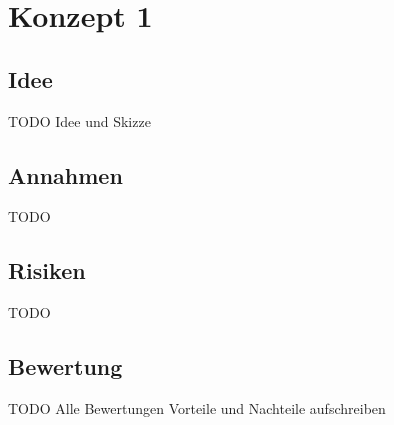 \section{Konzept 1}

\subsection{Idee}
TODO Idee und Skizze

\subsection{Annahmen}
TODO

\subsection{Risiken}
TODO

\subsection{Bewertung}
TODO Alle Bewertungen
Vorteile und Nachteile aufschreiben